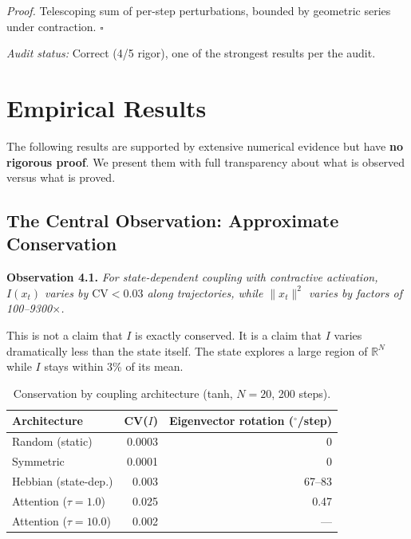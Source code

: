 \documentclass[11pt]{article}
\begin{document}
\textit{Proof.} Telescoping sum of per-step perturbations, bounded by geometric series under contraction. $\square$

\textit{Audit status:} Correct (4/5 rigor), one of the strongest results per the audit.

\section{Empirical Results}

The following results are supported by extensive numerical evidence but have \textbf{no rigorous proof}. We present them with full transparency about what is observed versus what is proved.

\subsection{The Central Observation: Approximate Conservation}

\textbf{Observation 4.1.} \textit{For state-dependent coupling with contractive activation, $I(x_t)$ varies by $\mathrm{CV} < 0.03$ along trajectories, while $\|x_t\|^2$ varies by factors of 100--9300$\times$.}

This is not a claim that $I$ is exactly conserved. It is a claim that $I$ varies dramatically less than the state itself. The state explores a large region of $\mathbb{R}^N$ while $I$ stays within 3\% of its mean.

\begin{table}[h]
  \centering
  \caption{Conservation by coupling architecture (tanh, $N = 20$, 200 steps).}
  \label{tab:architectures}
  \begin{tabular}{lrr}
    \toprule
    Architecture & CV($I$) & Eigenvector rotation ($^\circ$/step) \\
    \midrule
    Random (static)      & 0.0003 & 0 \\
    Symmetric            & 0.0001 & 0 \\
    Hebbian (state-dep.) & 0.003  & 67--83 \\
    Attention ($\tau=1.0$)  & 0.025  & 0.47 \\
    Attention ($\tau=10.0$) & 0.002  & --- \\
    \bottomrule
  \end{tabular}
\end{table}
\end{document}
